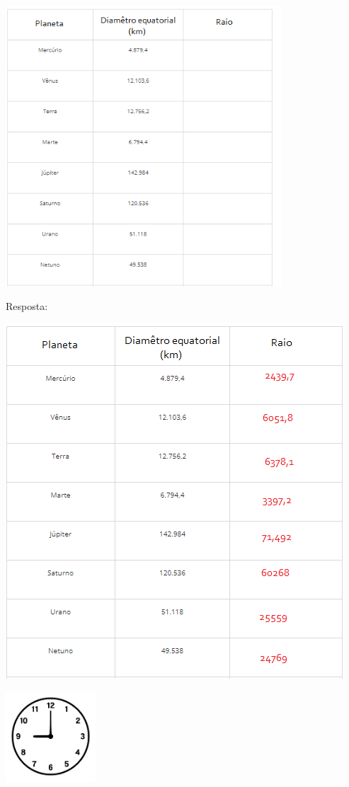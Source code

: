 \includegraphics[width=4.05833in,height=4.13212in]{./imgSAEB_6_MAT/media/image48.png}

Resposta:

\includegraphics[width=4.96875in,height=5.22917in]{./imgSAEB_6_MAT/media/image49.png}

\includegraphics[width=1.32083in,height=1.32083in]{./imgSAEB_6_MAT/media/image50.jpeg}

